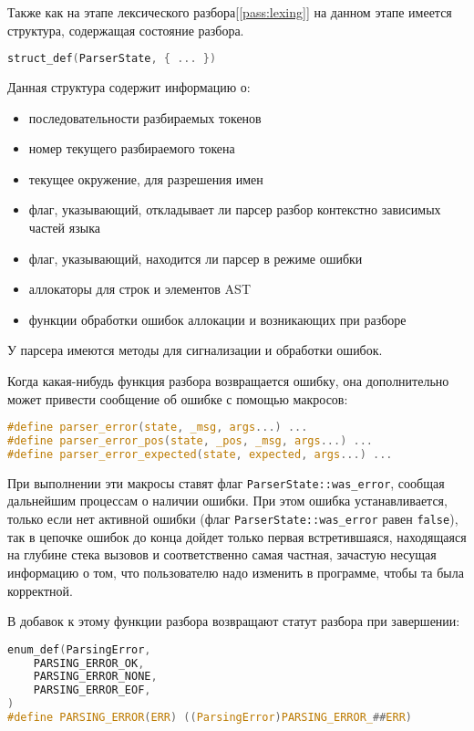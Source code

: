 Также как на этапе лексического разбора[\ref{pass:lexing}] на данном этапе имеется структура, содержащая состояние разбора.

\begin{lstlisting}[language=c]
struct_def(ParserState, { ... })
\end{lstlisting}

Данная структура содержит информацию о:
\begin{itemize}
    \item последовательности разбираемых токенов
    \item номер текущего разбираемого токена
    \item текущее окружение, для разрешения имен
    \item флаг, указывающий, откладывает ли парсер разбор контекстно зависимых частей языка
    \item флаг, указывающий, находится ли парсер в режиме ошибки
    \item аллокаторы для строк и элементов AST
    \item функции обработки ошибок аллокации и возникающих при разборе
\end{itemize}



У парсера имеются методы для сигнализации и обработки ошибок.

Когда какая-нибудь функция разбора возвращается ошибку, она дополнительно может привести сообщение об ошибке с помощью макросов:

\begin{lstlisting}[language=c, caption={Макросы сообщения об ошибке}]
#define parser_error(state, _msg, args...) ...
#define parser_error_pos(state, _pos, _msg, args...) ...
#define parser_error_expected(state, expected, args...) ... 
\end{lstlisting}

При выполнении эти макросы ставят флаг \verb|ParserState::was_error|, сообщая дальнейшим процессам о наличии ошибки.
При этом ошибка устанавливается, только если нет активной ошибки (флаг \verb|ParserState::was_error| равен \verb|false|), так в цепочке ошибок до конца дойдет только первая встретившаяся, 
находящаяся на глубине стека вызовов и соответственно самая частная, зачастую несущая информацию о том, что пользователю надо изменить в программе, чтобы та была корректной.

В добавок к этому функции разбора возвращают статут разбора при завершении:
\begin{lstlisting}[language=c, caption={Виды статуса возвращаемого значения парсера}]
enum_def(ParsingError, 
    PARSING_ERROR_OK,
    PARSING_ERROR_NONE,
    PARSING_ERROR_EOF,
)
#define PARSING_ERROR(ERR) ((ParsingError)PARSING_ERROR_##ERR)
\end{lstlisting}

